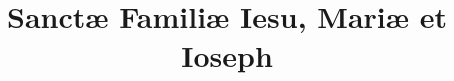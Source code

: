 \documentclass[17pt]{extarticle}
\begin{document}
\title{Sanctæ Familiæ Iesu, Mariæ et Ioseph}
\makereadingtitle

\end{document}
